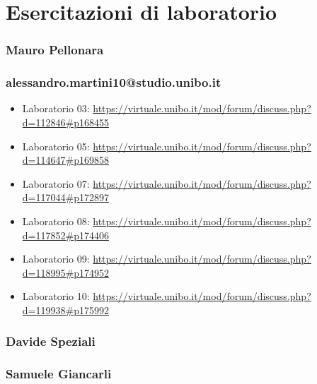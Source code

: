 \section{Esercitazioni di laboratorio}
\subsubsection*{Mauro Pellonara} 

\subsubsection*{alessandro.martini10@studio.unibo.it}
\begin{itemize}
    \item Laboratorio 03: \url{https://virtuale.unibo.it/mod/forum/discuss.php?d=112846#p168455}
    \item Laboratorio 05: \url{https://virtuale.unibo.it/mod/forum/discuss.php?d=114647#p169858}
    \item Laboratorio 07: \url{https://virtuale.unibo.it/mod/forum/discuss.php?d=117044#p172897}
    \item Laboratorio 08: \url{https://virtuale.unibo.it/mod/forum/discuss.php?d=117852#p174406}
    \item Laboratorio 09: \url{https://virtuale.unibo.it/mod/forum/discuss.php?d=118995#p174952}
    \item Laboratorio 10: \url{https://virtuale.unibo.it/mod/forum/discuss.php?d=119938#p175992}
\end{itemize}

\subsubsection*{Davide Speziali}

\subsubsection*{Samuele Giancarli}